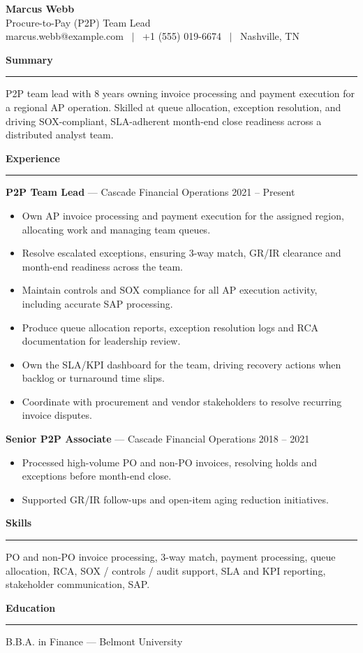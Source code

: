 \documentclass[11pt]{article}
\newcommand{\rsection}[1]{%
  \vspace{10pt}
  {\large\bfseries #1}\\[-4pt]
  \rule{\linewidth}{0.6pt}\vspace{4pt}
}
\begin{document}
\begin{center}
  {\Huge\bfseries Marcus Webb}\\[4pt]
  Procure-to-Pay (P2P) Team Lead \\
  marcus.webb@example.com \ $\vert$ \ +1 (555) 019-6674 \ $\vert$ \ Nashville, TN
\end{center}

\rsection{Summary}
P2P team lead with 8 years owning invoice processing and payment execution for a regional AP operation. Skilled at queue allocation, exception resolution, and driving SOX-compliant, SLA-adherent month-end close readiness across a distributed analyst team.

\rsection{Experience}
\textbf{P2P Team Lead} --- Cascade Financial Operations \hfill 2021 -- Present
\begin{itemize}
  \item Own AP invoice processing and payment execution for the assigned region, allocating work and managing team queues.
  \item Resolve escalated exceptions, ensuring 3-way match, GR/IR clearance and month-end readiness across the team.
  \item Maintain controls and SOX compliance for all AP execution activity, including accurate SAP processing.
  \item Produce queue allocation reports, exception resolution logs and RCA documentation for leadership review.
  \item Own the SLA/KPI dashboard for the team, driving recovery actions when backlog or turnaround time slips.
  \item Coordinate with procurement and vendor stakeholders to resolve recurring invoice disputes.
\end{itemize}

\textbf{Senior P2P Associate} --- Cascade Financial Operations \hfill 2018 -- 2021
\begin{itemize}
  \item Processed high-volume PO and non-PO invoices, resolving holds and exceptions before month-end close.
  \item Supported GR/IR follow-ups and open-item aging reduction initiatives.
\end{itemize}

\rsection{Skills}
PO and non-PO invoice processing, 3-way match, payment processing, queue allocation, RCA, SOX / controls / audit support, SLA and KPI reporting, stakeholder communication, SAP.

\rsection{Education}
B.B.A. in Finance --- Belmont University
\end{document}
